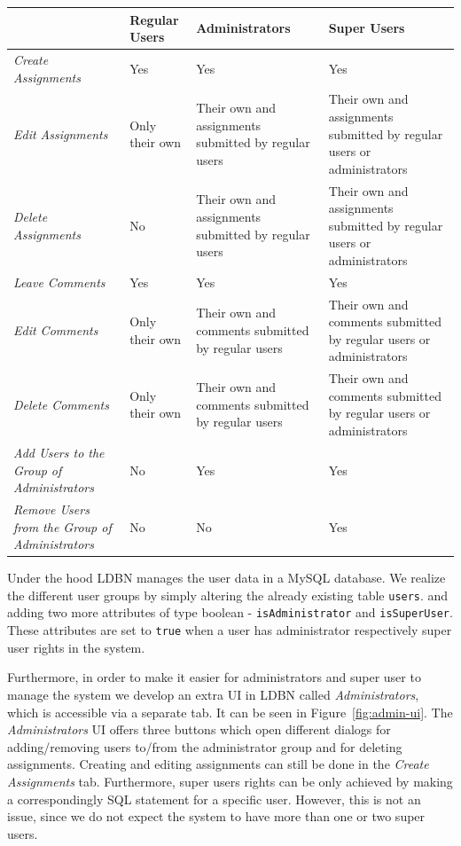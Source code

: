 \begin{center}
\begin{tabular}[h]{| m{2.5cm} || m{2.5cm} | m{3.2cm} | m{3.3cm} |}
\hline
 & \textbf{Regular Users} & \textbf{Administrators} & \textbf{Super Users} \\
\hline
\hline
\emph{Create \mbox{Assignments}} & Yes & Yes & Yes \\
\hline
\emph{Edit \mbox{Assignments}}  & Only their own & Their own and assignments submitted by regular users & Their own and assignments submitted by regular users or administrators \\
\hline
\emph{Delete \mbox{Assignments}} & No & Their own and assignments submitted by regular users & Their own and assignments submitted by regular users or administrators \\
\hline
\emph{Leave \mbox{Comments}}    & Yes & Yes & Yes \\
\hline
\emph{Edit \mbox{Comments}}     & Only their own & Their own and comments submitted by regular users & Their own and comments submitted by regular users or administrators\\
\hline
\emph{Delete \mbox{Comments}}   & Only their own & Their own and comments submitted by regular users & Their own and comments submitted by regular users or administrators \\
\hline
\emph{Add Users to the Group of \mbox{Administrators}} & No & Yes & Yes \\
\hline
\emph{Remove Users from the Group of \mbox{Administrators}} & No & No & Yes \\
\hline
\end{tabular}
\end{center}


Under the hood LDBN manages the user data in a MySQL database. 
We realize the different user groups by simply altering the already existing table \verb=users=. 
and adding two more attributes 
of type boolean - \verb=isAdministrator= and \verb=isSuperUser=. 
These attributes are set to \verb=true= when a user has administrator respectively  super
user rights in the system. 

Furthermore, in order to make it easier for administrators and super user to manage the system
we develop an extra UI in LDBN called \emph{Administrators}, which is accessible via a
separate tab. It can be seen in Figure~\ref{fig:admin-ui}. 
The \emph{Administrators} UI offers three buttons which open 
different dialogs for adding/removing users to/from the administrator group and for
deleting assignments. Creating and editing assignments can still be done in the 
\emph{Create Assignments} tab. Furthermore, super users rights can be only achieved by making
a correspondingly SQL statement for a specific user. However, this is not an issue, since 
we do not expect the system to have more than one or two super users. 

